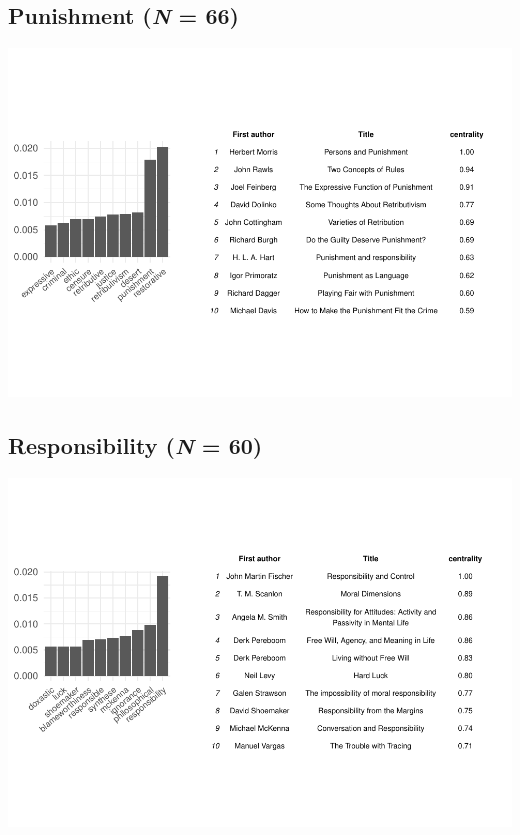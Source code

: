 \documentclass[
]{article}
\begin{document}
\hypertarget{punishment-n-66}{%
\subsection{\texorpdfstring{Punishment (\emph{N} = 66)}{Punishment (N = 66)}}\label{punishment-n-66}}

\begin{flushright}\includegraphics{paper_files/figure-latex/P-1} \end{flushright}

\hypertarget{responsibility-n-60}{%
\subsection{\texorpdfstring{Responsibility (\emph{N} = 60)}{Responsibility (N = 60)}}\label{responsibility-n-60}}

\begin{flushright}\includegraphics{paper_files/figure-latex/R-1} \end{flushright}
\end{document}
